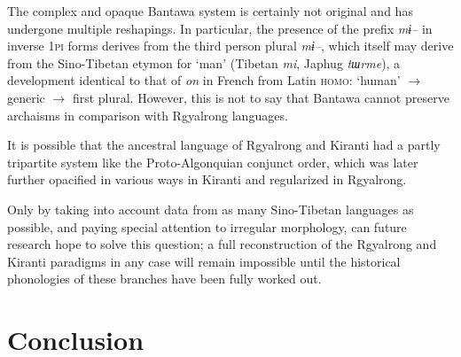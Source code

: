 \documentclass[twoside,a4paper,11pt]{article}
\newcommand{\ipa}[1]{{\phon\textit{#1}}}
\newcommand{\Σ}{\greek{Σ}}
\begin{document}
The complex and opaque Bantawa system is certainly not original and   has undergone multiple reshapings. In particular, the presence of the prefix \ipa{mɨ--} in inverse \textsc{1pi} forms derives from the third person plural \ipa{mɨ--}, which itself may derive from the Sino-Tibetan etymon for `man' (Tibetan \ipa{mi}, Japhug \ipa{tɯrme}), a development identical to that of \ipa{on} in French from Latin \textsc{homo}: `human' $\rightarrow$ generic $\rightarrow$ first plural. However, this is not to say that Bantawa cannot preserve archaisms in comparison with Rgyalrong languages.

It is possible that the ancestral language of Rgyalrong and Kiranti had a partly tripartite system like the Proto-Algonquian conjunct order, which was later further opacified in various ways in Kiranti and regularized in Rgyalrong.

Only by taking into account data from as many Sino-Tibetan languages as possible, and paying special attention to irregular morphology, can future research hope to solve this question; a  full reconstruction of the Rgyalrong and Kiranti paradigms in any case will remain impossible until the historical phonologies of these branches have been fully worked out.

\section{Conclusion}


 
 
\end{document}
